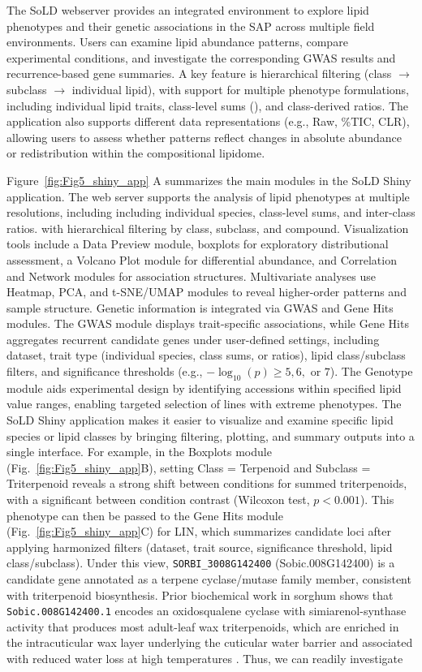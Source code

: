 \documentclass[9pt,twocolumn,twoside]{rilabRxiv}
\begin{document}
The SoLD webserver provides an integrated environment to explore lipid phenotypes and their genetic associations in the SAP across multiple field environments. Users can examine lipid abundance patterns, compare experimental conditions, and investigate the corresponding GWAS results and recurrence-based gene summaries. A key feature is hierarchical filtering (class $\rightarrow$ subclass $\rightarrow$ individual lipid), with support for multiple phenotype formulations, including individual lipid traits, class-level sums (\cite{Fahy2009LipidMapsClass}), and class-derived ratios. The application also supports different data representations (e.g., Raw, \%TIC, CLR), allowing users to assess whether patterns reflect changes in absolute abundance or redistribution within the compositional lipidome.

Figure~\ref{fig:Fig5_shiny_app} A summarizes the main modules in the SoLD Shiny application. The web server supports the analysis of lipid phenotypes at multiple resolutions, including including individual species, class-level sums, and inter-class ratios. with hierarchical filtering by class, subclass, and compound. Visualization tools include a Data Preview module, boxplots for exploratory distributional assessment, a Volcano Plot module for differential abundance, and Correlation and Network modules for association structures. Multivariate analyses use Heatmap, PCA, and t-SNE/UMAP modules to reveal higher-order patterns and sample structure. Genetic information is integrated via GWAS and Gene Hits modules. The GWAS module displays trait-specific associations, while Gene Hits aggregates recurrent candidate genes under user-defined settings, including dataset, trait type (individual species, class sums, or ratios), lipid class/subclass filters, and significance thresholds (e.g., $-\log_{10}(p)\ge 5, 6,$ or $7$). The Genotype module aids experimental design by identifying accessions within specified lipid value ranges, enabling targeted selection of lines with extreme phenotypes. The SoLD Shiny application makes it easier to visualize and examine specific lipid species or lipid classes by bringing filtering, plotting, and summary outputs into a single interface. For example, in the Boxplots module (Fig.~\ref{fig:Fig5_shiny_app}B), setting Class = Terpenoid and Subclass = Triterpenoid reveals a strong shift between conditions for summed triterpenoids, with a significant between condition contrast (Wilcoxon test, $p < 0.001$). This phenotype can then be passed to the Gene Hits module (Fig.~\ref{fig:Fig5_shiny_app}C) for LIN, which summarizes candidate loci after applying harmonized filters (dataset, trait source, significance threshold, lipid class/subclass). Under this view, \texttt{SORBI\_3008G142400} (Sobic.008G142400) is a candidate gene annotated as a terpene cyclase/mutase family member, consistent with triterpenoid biosynthesis. Prior biochemical work in sorghum shows that \texttt{Sobic.008G142400.1} encodes an oxidosqualene cyclase with simiarenol-synthase activity that produces most adult-leaf wax triterpenoids, which are enriched in the intracuticular wax layer underlying the cuticular water barrier and associated with reduced water loss at high temperatures \citep{Busta2021}. Thus, we can readily investigate 
\end{document}
